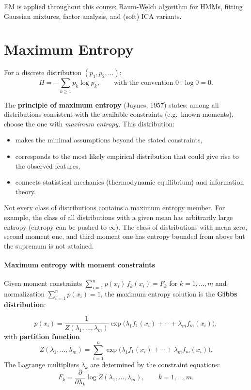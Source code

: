 \documentclass[11pt, oneside]{book}
\newcommand{\pd}[2]{\frac{\partial #1}{\partial #2}}
\begin{document}
EM is applied throughout this course: Baum-Welch algorithm for HMMs, fitting Gaussian
mixtures, factor analysis, and (soft) ICA variants.


\section{Maximum Entropy}
\label{sec:maxent}

\begin{defbox}[title={Shannon Entropy (discrete case)}]
For a discrete distribution $(p_1, p_2, \ldots)$:
\[
  H = -\sum_{k \geq 1} p_k \log p_k,
  \qquad \text{with the convention } 0 \cdot \log 0 = 0.
\]
\end{defbox}

The \textbf{principle of maximum entropy} (Jaynes, 1957) states: among all distributions
consistent with the available constraints (e.g.\ known moments), choose the one with
\emph{maximum entropy}.
This distribution:
\begin{itemize}
  \item makes the minimal assumptions beyond the stated constraints,
  \item corresponds to the most likely empirical distribution that could give rise to the
        observed features,
  \item connects statistical mechanics (thermodynamic equilibrium) and information theory.
\end{itemize}

\begin{notebox}[title={Existence caveat}]
Not every class of distributions contains a maximum entropy member.
For example, the class of all distributions with a given mean has arbitrarily large
entropy (entropy can be pushed to $\infty$).
The class of distributions with mean zero, second moment one, and third moment one has
entropy bounded from above but the supremum is not attained.
\end{notebox}

\paragraph{Maximum entropy with moment constraints}
Given moment constraints $\sum_{i=1}^n p(x_i)\,f_k(x_i) = F_k$ for $k=1,\ldots,m$
and normalization $\sum_{i=1}^n p(x_i) = 1$, the maximum entropy solution is the
\textbf{Gibbs distribution}:

\begin{thmbox}[title={Gibbs Distribution (MaxEnt Solution)}]
\[
  p(x_i) = \frac{1}{Z(\lambda_1,\ldots,\lambda_m)}
  \exp\!\bigl(\lambda_1 f_1(x_i) + \cdots + \lambda_m f_m(x_i)\bigr),
\]
with \textbf{partition function}
\[
  Z(\lambda_1,\ldots,\lambda_m) = \sum_{i=1}^n \exp\!\bigl(\lambda_1 f_1(x_i) + \cdots + \lambda_m f_m(x_i)\bigr).
\]
The Lagrange multipliers $\lambda_k$ are determined by the constraint equations:
\[
  F_k = \pd{}{\lambda_k} \log Z(\lambda_1,\ldots,\lambda_m), \qquad k = 1,\ldots,m.
\]
\end{thmbox}
\end{document}
